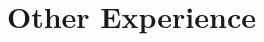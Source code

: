 \documentclass[letterpaper,10pt]{article}
\begin{document}
\begin{itemize}
\end{itemize}

\vspace*{-0.7cm}
\section*{Other Experience}
\vspace*{-0.2cm}
\end{document}
